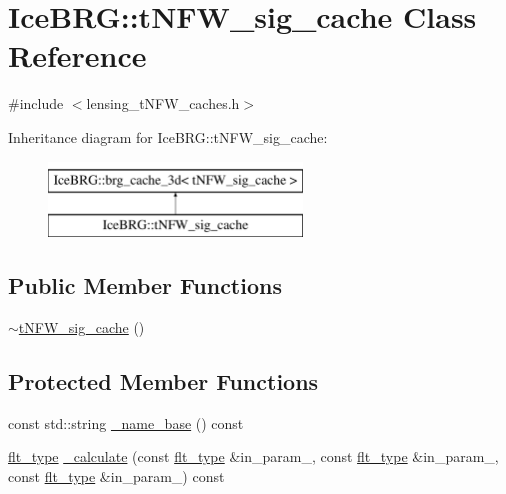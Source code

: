\hypertarget{classIceBRG_1_1tNFW__sig__cache}{\section{Ice\-B\-R\-G\-:\-:t\-N\-F\-W\-\_\-sig\-\_\-cache Class Reference}
\label{classIceBRG_1_1tNFW__sig__cache}
}


{\ttfamily \#include $<$lensing\-\_\-t\-N\-F\-W\-\_\-caches.\-h$>$}

Inheritance diagram for Ice\-B\-R\-G\-:\-:t\-N\-F\-W\-\_\-sig\-\_\-cache\-:\begin{figure}[H]
\begin{center}
\leavevmode
\includegraphics[height=2.000000cm]{classIceBRG_1_1tNFW__sig__cache}
\end{center}
\end{figure}
\subsection*{Public Member Functions}
\begin{DoxyCompactItemize}
\item 
\hyperlink{classIceBRG_1_1tNFW__sig__cache_a5debb1198b2d0a1d53e8c8deb43f6a5a}{$\sim$t\-N\-F\-W\-\_\-sig\-\_\-cache} ()
\end{DoxyCompactItemize}
\subsection*{Protected Member Functions}
\begin{DoxyCompactItemize}
\item 
const std\-::string \hyperlink{classIceBRG_1_1tNFW__sig__cache_a2a2c3ab5ce403a9718796b15a9cff55c}{\-\_\-name\-\_\-base} () const 
\item 
\hyperlink{lib_2IceBRG__main_2common_8h_ad0f130a56eeb944d9ef2692ee881ecc4}{flt\-\_\-type} \hyperlink{classIceBRG_1_1tNFW__sig__cache_ae26a90e0eda69be614a622816629cc76}{\-\_\-calculate} (const \hyperlink{lib_2IceBRG__main_2common_8h_ad0f130a56eeb944d9ef2692ee881ecc4}{flt\-\_\-type} \&in\-\_\-param\-\_, const \hyperlink{lib_2IceBRG__main_2common_8h_ad0f130a56eeb944d9ef2692ee881ecc4}{flt\-\_\-type} \&in\-\_\-param\-\_, const \hyperlink{lib_2IceBRG__main_2common_8h_ad0f130a56eeb944d9ef2692ee881ecc4}{flt\-\_\-type} \&in\-\_\-param\-\_) const 
\end{DoxyCompactItemize}

